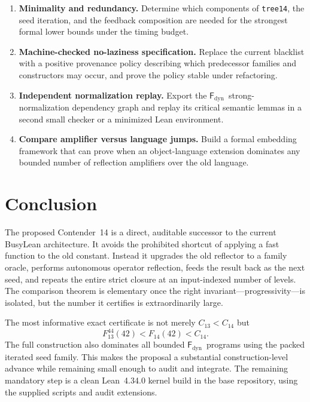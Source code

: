 \documentclass[11pt]{article}
\theoremstyle{definition}
\newcommand{\Fd}{\ensuremath{\mathsf{F}_{\mathrm{dyn}}}}
\newcommand{\lean}[1]{\texttt{#1}}
\begin{document}
\begin{enumerate}[leftmargin=2.1em]
  \item \textbf{Minimality and redundancy.}  Determine which components of
  \lean{tree14}, the seed iteration, and the feedback composition are needed
  for the strongest formal lower bounds under the timing budget.

  \item \textbf{Machine-checked no-laziness specification.}  Replace the
  current blacklist with a positive provenance policy describing which
  predecessor families and constructors may occur, and prove the policy stable
  under refactoring.

  \item \textbf{Independent normalization replay.}  Export the \Fd\ strong-
  normalization dependency graph and replay its critical semantic lemmas in a
  second small checker or a minimized Lean environment.

  \item \textbf{Compare amplifier versus language jumps.}  Build a formal
  embedding framework that can prove when an object-language extension
  dominates any bounded number of reflection amplifiers over the old language.
\end{enumerate}

\section{Conclusion}

The proposed Contender~14 is a direct, auditable successor to the current
BusyLean architecture.  It avoids the prohibited shortcut of applying a fast
function to the old constant.  Instead it upgrades the old reflector to a
family oracle, performs autonomous operator reflection, feeds the result back
as the next seed, and repeats the entire strict closure at an input-indexed
number of levels.  The comparison theorem is elementary once the right
invariant---progressivity---is isolated, but the number it certifies is
extraordinarily large.

The most informative exact certificate is not merely $C_{13}<C_{14}$ but
\[
  F_{13}^{44}(42)<F_{14}(42)<C_{14}.
\]
The full construction also dominates all bounded \Fd\ programs using the
packed iterated seed family.  This makes the proposal a substantial
construction-level advance while remaining small enough to audit and integrate.
The remaining mandatory step is a clean Lean~4.34.0 kernel build in the base
repository, using the supplied scripts and audit extensions.
\end{document}
